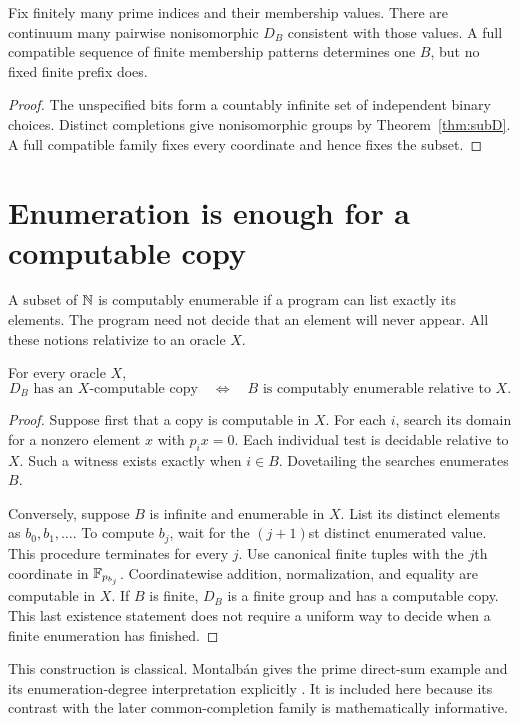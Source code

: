 \begin{corollary}
\label{thm:finiteviews}
Fix finitely many prime indices and their membership values. There are continuum many pairwise nonisomorphic $D_B$ consistent with those values. A full compatible sequence of finite membership patterns determines one $B$, but no fixed finite prefix does.
\end{corollary}
\begin{proof}
The unspecified bits form a countably infinite set of independent binary choices. Distinct completions give nonisomorphic groups by Theorem~\ref{thm:subD}. A full compatible family fixes every coordinate and hence fixes the subset.
\end{proof}

\section{Enumeration is enough for a computable copy}
A subset of $\mathbb N$ is computably enumerable if a program can list exactly its elements. The program need not decide that an element will never appear. All these notions relativize to an oracle $X$.

\begin{theorem}
\label{thm:spectrumce}
For every oracle $X$,
\[
D_B\text{ has an }X\text{-computable copy}
\quad\Longleftrightarrow\quad
B\text{ is computably enumerable relative to }X.
\]
\end{theorem}
\begin{proof}
Suppose first that a copy is computable in $X$. For each $i$, search its domain for a nonzero element $x$ with $p_i x=0$. Each individual test is decidable relative to $X$. Such a witness exists exactly when $i\in B$. Dovetailing the searches enumerates $B$.

Conversely, suppose $B$ is infinite and enumerable in $X$. List its distinct elements as $b_0,b_1,\ldots$. To compute $b_j$, wait for the $(j+1)$st distinct enumerated value. This procedure terminates for every $j$. Use canonical finite tuples with the $j$th coordinate in $\mathbb F_{p_{b_j}}$. Coordinatewise addition, normalization, and equality are computable in $X$. If $B$ is finite, $D_B$ is a finite group and has a computable copy. This last existence statement does not require a uniform way to decide when a finite enumeration has finished.
\end{proof}
This construction is classical. Montalb\'an gives the prime direct-sum example and its enumeration-degree interpretation explicitly \cite[Example III.39]{Montalban}. It is included here because its contrast with the later common-completion family is mathematically informative.


